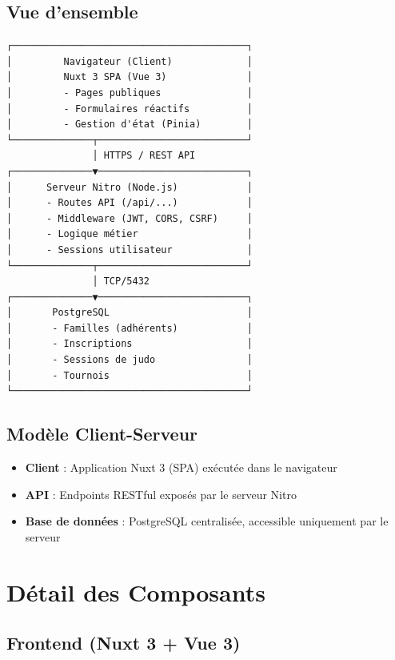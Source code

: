\documentclass[11pt,a4paper]{article}
\begin{document}
\subsection{Vue d'ensemble}
\begin{verbatim}
┌─────────────────────────────────────────┐
│         Navigateur (Client)             │
│         Nuxt 3 SPA (Vue 3)              │
│         - Pages publiques               │
│         - Formulaires réactifs          │
│         - Gestion d'état (Pinia)        │
└──────────────┬──────────────────────────┘
               │ HTTPS / REST API
┌──────────────▼──────────────────────────┐
│      Serveur Nitro (Node.js)            │
│      - Routes API (/api/...)            │
│      - Middleware (JWT, CORS, CSRF)     │
│      - Logique métier                   │
│      - Sessions utilisateur             │
└──────────────┬──────────────────────────┘
               │ TCP/5432
┌──────────────▼──────────────────────────┐
│       PostgreSQL                        │
│       - Familles (adhérents)            │
│       - Inscriptions                    │
│       - Sessions de judo                │
│       - Tournois                        │
└─────────────────────────────────────────┘
\end{verbatim}

\subsection{Modèle Client-Serveur}
\begin{itemize}
  \item \textbf{Client} : Application Nuxt 3 (SPA) exécutée dans le navigateur
  \item \textbf{API} : Endpoints RESTful exposés par le serveur Nitro
  \item \textbf{Base de données} : PostgreSQL centralisée, accessible uniquement par le serveur
\end{itemize}

\section{Détail des Composants}

\subsection{Frontend (Nuxt 3 + Vue 3)}
\end{document}
